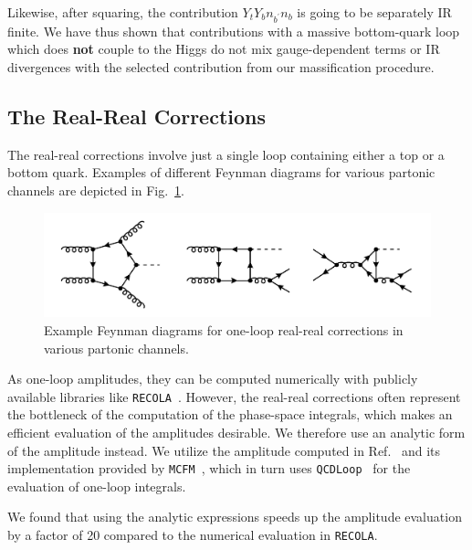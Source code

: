Likewise, after squaring, the contribution $Y_t Y_b n_{b^\prime} n_{b}$ is going to be separately \acs{IR} finite. We have thus shown that contributions with a massive bottom-quark loop which does \textbf{not} couple to the Higgs do not mix gauge-dependent terms or \acs{IR} divergences with the selected contribution from our massification procedure.

\subsection{The Real-Real Corrections}
The real-real corrections involve just a single loop containing either a top or a bottom quark. Examples of different Feynman diagrams for various partonic channels are depicted in Fig.~\ref{fig:5:real_real}.
\begin{figure}[h]
  \centering
  \includegraphics[scale=0.5]{Images/NNLO_Feynman_diagrams/RealReal.pdf}
  \caption{Example Feynman diagrams for one-loop real-real corrections in various partonic channels.}
  \label{fig:5:real_real}
\end{figure}

As one-loop amplitudes, they can be computed numerically with publicly available libraries like \texttt{RECOLA}~\cite{Actis:2016mpe}. However, the real-real corrections often represent the bottleneck of the computation of the phase-space integrals, which makes an efficient evaluation of the amplitudes desirable. We therefore use an analytic form of the amplitude instead. We utilize the amplitude computed in Ref.~\cite{Budge:2020oyl} and its implementation provided by \texttt{MCFM}~\cite{Campbell:2019dru, Campbell:1999ah, Campbell:2011bn}, which in turn uses \texttt{QCDLoop}~\cite{Ellis:2007qk, Carrazza:2016gav} for the evaluation of one-loop integrals.

We found that using the analytic expressions speeds up the amplitude evaluation by a factor of 20 compared to the numerical evaluation in \texttt{RECOLA}.

